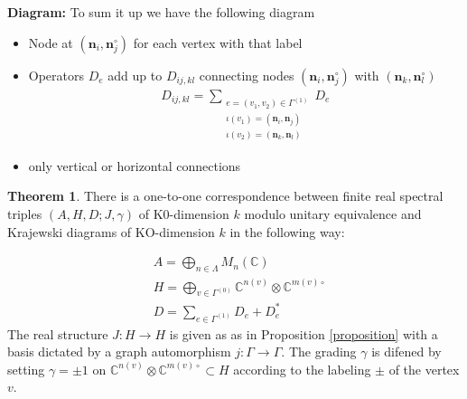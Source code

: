 \documentclass[a4paper]{article}
\theoremstyle{definition}
\theoremstyle{definition}
\theoremstyle{definition}
\theoremstyle{theorem}
\newtheorem{theorem}{Theorem}
\theoremstyle{theorem}
\theoremstyle{theorem}
\begin{document}
\textbf{Diagram:} To sum it up we have the following diagram
\begin{itemize}
    \item Node at $(\textbf{n}_i, \textbf{n}_j^\circ)$ for each vertex with that label
    \item Operators $D_e$  add up to $D_{ij,kl}$ connecting nodes $(\textbf{n}_i,
        \textbf{n}_j^\circ)$ with $(\textbf{n}_k, \textbf{n}_l^\circ)$
        \begin{align}
            D_{ij, kl} = \sum\limits_{\substack{e=(v_1, v_2) \in \Gamma^{(1)}
            \\ \iota(v_1) = (\textbf{n}_i, \textbf{n}_j)\\
            \iota(v_2)=(\textbf{n}_k, \textbf{n}_l)}} D_e
        \end{align}
    \item only vertical or horizontal connections
\end{itemize}

\begin{theorem}
    There is a one-to-one correspondence between finite real spectral triples
    $(A, H, D; J, \gamma)$
    of K0-dimension $k$ modulo unitary equivalence and Krajewski diagrams of
    KO-dimension $k$ in the following way:

    \begin{align}
        & A = \bigoplus_{n \in \Lambda} M_n(\mathbb{C})\\
        & H = \bigoplus_{v \in \Gamma^{(0)}} \mathbb{C}^{n(v)} \otimes
        \mathbb{C}^{m(v)\circ}\\
        & D = \sum_{e\in \Gamma^{(1)}} D_e + D_e^*
    \end{align}
    The real structure $J:H\rightarrow H$ is given as as in Proposition
    \ref{proposition} with  a basis dictated by a graph automorphism $j: \Gamma
    \rightarrow \Gamma$. The grading $\gamma$ is difened by setting $\gamma =
    \pm 1$ on $\mathbb{C}^{n(v)} \otimes \mathbb{C}^{m(v)\circ} \subset H$
    according to the labeling $\pm$ of the vertex $v$.
\end{theorem}
\end{document}
